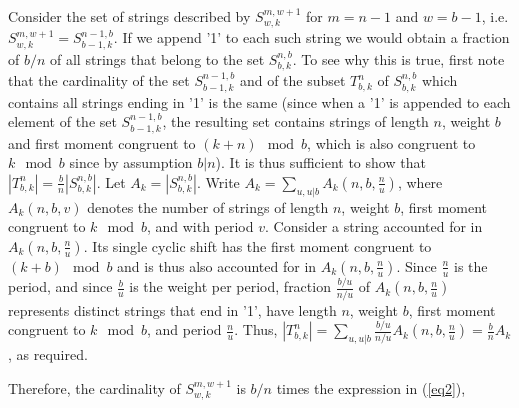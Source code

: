\documentclass[12pt]{article} \pagestyle{plain} \topmargin
\begin{document}
Consider the set of strings described by $S_{w,k}^{m,w+1}$ for
$m=n-1$ and $w=b-1$, i.e. $S_{w,k}^{m,w+1} = S_{b-1,k}^{n-1,b}$. If
we append '1' to each such string we would obtain a fraction of
$b/n$ of all strings that belong to the set
$S_{b,k}^{n,b}$. %
To see why this is true, first note that the cardinality of the set
$S_{b-1,k}^{n-1,b}$ and of the subset $T_{b,k}^n$ of $S_{b,k}^{n,b}$
which contains all strings ending in '1' is the same (since when a
'1' is appended to each element of the set $S_{b-1,k}^{n-1,b}$, the
resulting set contains strings of length $n$, weight $b$ and first
moment congruent to $(k+n) \mod b$, which is also congruent to $k
\mod b$ since by assumption $b | n$). It is thus sufficient to show
that $|T_{b,k}^n|=\frac{b}{n} |S_{b,k}^{n,b}|$. Let
$A_k=|S_{b,k}^{n,b}|$. Write $A_k=\sum_{u,u|b}
A_k(n,b,\frac{n}{u})$, where $A_k(n,b,v)$ denotes the number of
strings of length $n$, weight $b$, first moment congruent to $k \mod
b$, and with period $v$. Consider a string accounted for in
$A_k(n,b,\frac{n}{u})$. Its single cyclic shift has the first moment
congruent to $(k+b) \mod b$ and is thus also accounted for in
$A_k(n,b,\frac{n}{u})$. Since $\frac{n}{u}$ is the period, and since
$\frac{b}{u}$ is the weight per period, fraction $\frac{b/u}{n/u}$
of $A_k(n,b,\frac{n}{u})$ represents distinct strings that end in
'1', have length $n$, weight $b$, first moment congruent to $k \mod
b$, and period $\frac{n}{u}$. Thus,
 $|T_{b,k}^n|=\sum_{u,u|b} \frac{b/u}{n/u}
 A_k(n,b,\frac{n}{u})=\frac{b}{n}A_k$, as required.


Therefore, the cardinality of $S_{w,k}^{m,w+1}$ is $b/n$ times the
expression in (\ref{eq2}),
\end{document}
